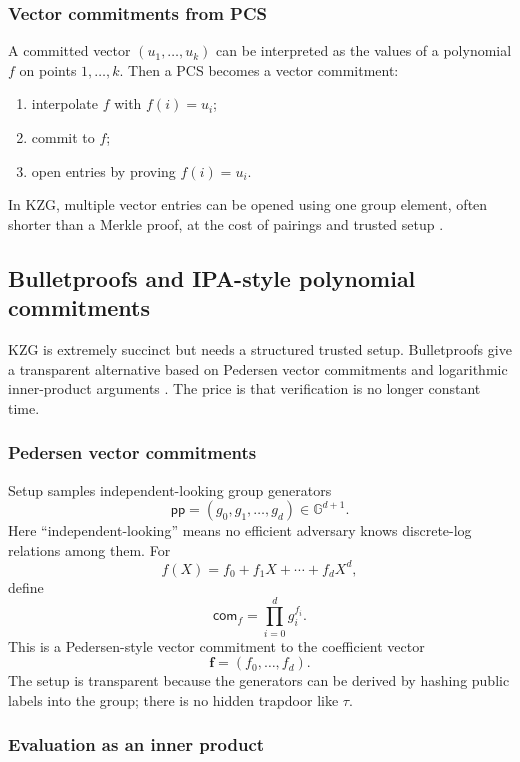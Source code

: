 \documentclass[11pt]{article}
\newcommand{\pp}{\mathsf{pp}}
\newcommand{\G}{\mathbb{G}}
\begin{document}
\subsubsection{Vector commitments from PCS}

A committed vector $(u_1,\dots,u_k)$ can be interpreted as the values of a polynomial $f$ on points $1,\dots,k$. Then a PCS becomes a vector commitment:
\begin{enumerate}[leftmargin=2em]
    \item interpolate $f$ with $f(i)=u_i$;
    \item commit to $f$;
    \item open entries by proving $f(i)=u_i$.
\end{enumerate}
In KZG, multiple vector entries can be opened using one group element, often shorter than a Merkle proof, at the cost of pairings and trusted setup \cite{KateZaveruchaGoldberg2010}.

\subsection{Bulletproofs and IPA-style polynomial commitments}

KZG is extremely succinct but needs a structured trusted setup. Bulletproofs give a transparent alternative based on Pedersen vector commitments and logarithmic inner-product arguments \cite{Pedersen1991,BootleCerulliChaidosGrothPetit2016,Bulletproofs2018}. The price is that verification is no longer constant time.

\subsubsection{Pedersen vector commitments}

Setup samples independent-looking group generators
\[
    \pp=(g_0,g_1,\ldots,g_d)\in \G^{d+1}.
\]
Here ``independent-looking'' means no efficient adversary knows discrete-log relations among them. For
\[
    f(X)=f_0+f_1X+\cdots+f_dX^d,
\]
define
\[
    \mathsf{com}_f=\prod_{i=0}^{d} g_i^{f_i}.
\]
This is a Pedersen-style vector commitment to the coefficient vector
\[
    \mathbf f=(f_0,\ldots,f_d).
\]
The setup is transparent because the generators can be derived by hashing public labels into the group; there is no hidden trapdoor like $\tau$.

\subsubsection{Evaluation as an inner product}
\end{document}
